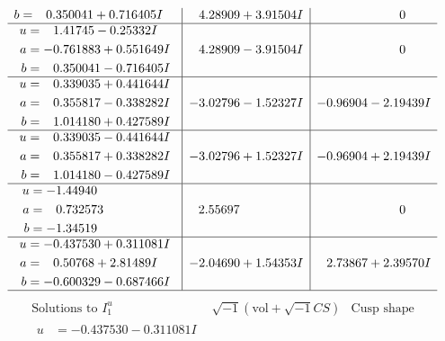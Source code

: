 \documentclass[1p]{elsarticle_modified}
\theoremstyle{definition}
\newcommand{\I}{\sqrt{-1}}
\begin{document}
$$\begin{array}{c|c|c}
\begin{aligned}
b &= \phantom{-}0.350041 + 0.716405 I\end{aligned}
 & \phantom{-}4.28909 + 3.91504 I & \phantom{-0.000000 } 0 \\ \hline\begin{aligned}
u &= \phantom{-}1.41745 - 0.25332 I \\
a &= -0.761883 + 0.551649 I \\
b &= \phantom{-}0.350041 - 0.716405 I\end{aligned}
 & \phantom{-}4.28909 - 3.91504 I & \phantom{-0.000000 } 0 \\ \hline\begin{aligned}
u &= \phantom{-}0.339035 + 0.441644 I \\
a &= \phantom{-}0.355817 - 0.338282 I \\
b &= \phantom{-}1.014180 + 0.427589 I\end{aligned}
 & -3.02796 - 1.52327 I & -0.96904 - 2.19439 I \\ \hline\begin{aligned}
u &= \phantom{-}0.339035 - 0.441644 I \\
a &= \phantom{-}0.355817 + 0.338282 I \\
b &= \phantom{-}1.014180 - 0.427589 I\end{aligned}
 & -3.02796 + 1.52327 I & -0.96904 + 2.19439 I \\ \hline\begin{aligned}
u &= -1.44940\phantom{ +0.000000I} \\
a &= \phantom{-}0.732573\phantom{ +0.000000I} \\
b &= -1.34519\phantom{ +0.000000I}\end{aligned}
 & \phantom{-}2.55697\phantom{ +0.000000I} & \phantom{-0.000000 } 0 \\ \hline\begin{aligned}
u &= -0.437530 + 0.311081 I \\
a &= \phantom{-}0.50768 + 2.81489 I \\
b &= -0.600329 - 0.687466 I\end{aligned}
 & -2.04690 + 1.54353 I & \phantom{-}2.73867 + 2.39570 I\\
 \hline 
 \end{array}$$\newpage$$\begin{array}{c|c|c}  
\text{Solutions to }I^u_{1}& \I (\text{vol} + \sqrt{-1}CS) & \text{Cusp shape}\\
 \hline 
\begin{aligned}
u &= -0.437530 - 0.311081 I \\

\end{aligned}
\end{array}$$
\end{document}
